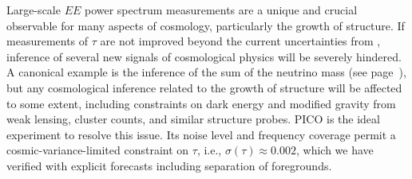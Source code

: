 \documentclass[PICOReport.tex]{subfiles}
\begin{document}
Large-scale $EE$ power spectrum measurements are a unique and crucial observable for many aspects of cosmology, particularly the growth of structure.  If measurements of $\tau$ are not improved beyond the current uncertainties from \planck , inference of several new signals of cosmological physics will be severely hindered.  A canonical example is the inference of the sum of the neutrino mass (see page~\pageref{neutrino_fundamental}), but any cosmological inference related to the growth of structure will be affected to some extent, including constraints on dark energy and modified gravity from weak lensing, cluster counts, and similar structure probes.  PICO is the ideal experiment to resolve this issue.  Its noise level and frequency coverage permit a cosmic-variance-limited constraint on $\tau$, i.e., $\sigma(\tau) \approx 0.002$, which we have verified with explicit forecasts including separation of foregrounds. 
\end{document}
